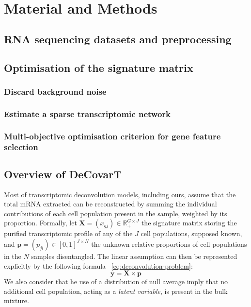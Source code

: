 \documentclass[long, final]{jobim}
\begin{document}
\section{Material and Methods}
\label{sec:methods}

\subsection{RNA sequencing datasets and preprocessing}
\label{subsec:preprocessing}

\subsection{Optimisation of the signature matrix}
\label{subsec:signature-matrix}

\subsubsection{Discard background noise}
\label{subsubsec:background-noise}

\subsubsection{Estimate a sparse transcriptomic network}
\label{subsubsec:gLasso}

\subsubsection{Multi-objective optimisation criterion for gene feature selection}
\label{subsubsec:genetic-algorithm}

\subsection{Overview of DeCovarT}
\label{subsec:DeCovarT}

Most of transcriptomic deconvolution models, including ours, assume that the total mRNA extracted can be reconstructed by summing the individual contributions of each cell population present in the sample, weighted by its proportion. Formally, let \(\boldsymbol{X}=(x_{gj}) \in \mathbb{R}_+^{G\times J}\) the signature matrix storing the purified transcriptomic profile of any of the $J$ cell populations, supposed known, and \(\boldsymbol{p}=(p_{ji})\in [0, 1]^{J \times N}\) the unknown relative proportions of cell populations in the $N$ samples disentangled. The linear assumption can then be represented explicitly by the following formula \equationname ~\ref{eq:deconvolution-problem}: 
\begin{equation}
\label{eq:deconvolution-problem}
\boldsymbol{y}=\boldsymbol{X} \times \boldsymbol{p}
\end{equation} We also consider that he use of a distribution of null average imply that no additional cell population, acting as a \emph{latent variable}, is present in the bulk mixture.
\end{document}

